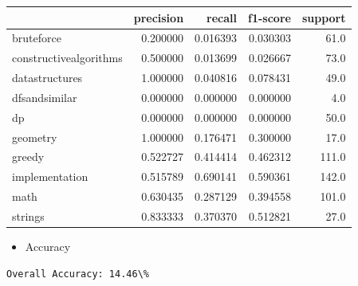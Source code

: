 \documentclass{article}
\begin{document}
\begin{tabular}{lrrrr}
    \toprule
    {}                     & precision & recall   & f1-score & support \\
    \midrule
    bruteforce             & 0.200000  & 0.016393 & 0.030303 & 61.0    \\
    constructivealgorithms & 0.500000  & 0.013699 & 0.026667 & 73.0    \\
    datastructures         & 1.000000  & 0.040816 & 0.078431 & 49.0    \\
    dfsandsimilar          & 0.000000  & 0.000000 & 0.000000 & 4.0     \\
    dp                     & 0.000000  & 0.000000 & 0.000000 & 50.0    \\
    geometry               & 1.000000  & 0.176471 & 0.300000 & 17.0    \\
    greedy                 & 0.522727  & 0.414414 & 0.462312 & 111.0   \\
    implementation         & 0.515789  & 0.690141 & 0.590361 & 142.0   \\
    math                   & 0.630435  & 0.287129 & 0.394558 & 101.0   \\
    strings                & 0.833333  & 0.370370 & 0.512821 & 27.0    \\
    \bottomrule
\end{tabular}

\begin{itemize}
    \item Accuracy
\end{itemize}
\begin{verbatim}
Overall Accuracy: 14.46\%
\end{verbatim}
\end{document}
